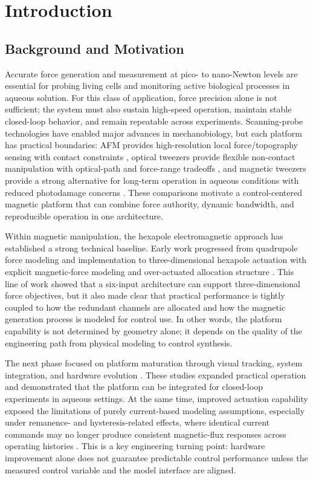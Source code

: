 \chapter{Introduction}

\section{Background and Motivation}

Accurate force generation and measurement at pico- to nano-Newton levels are essential for probing living cells and monitoring active biological processes in aqueous solution. For this class of application, force precision alone is not sufficient; the system must also sustain high-speed operation, maintain stable closed-loop behavior, and remain repeatable across experiments. Scanning-probe technologies have enabled major advances in mechanobiology, but each platform has practical boundaries: AFM provides high-resolution local force/topography sensing with contact constraints \cite{binnig1986afm,neuman2008singlemolecule}, optical tweezers provide flexible non-contact manipulation with optical-path and force-range tradeoffs \cite{ashkin1986observation,neuman2008singlemolecule}, and magnetic tweezers provide a strong alternative for long-term operation in aqueous conditions with reduced photodamage concerns \cite{gosse2002magnetic,devlaminck2012magnetic}. These comparisons motivate a control-centered magnetic platform that can combine force authority, dynamic bandwidth, and reproducible operation in one architecture.

Within magnetic manipulation, the hexapole electromagnetic approach has established a strong technical baseline. Early work progressed from quadrupole force modeling and implementation \cite{zhang2010quadrupole} to three-dimensional hexapole actuation with explicit magnetic-force modeling and over-actuated allocation structure \cite{zhang2011design}. This line of work showed that a six-input architecture can support three-dimensional force objectives, but it also made clear that practical performance is tightly coupled to how the redundant channels are allocated and how the magnetic generation process is modeled for control use. In other words, the platform capability is not determined by geometry alone; it depends on the quality of the engineering path from physical modeling to control synthesis.

The next phase focused on platform maturation through visual tracking, system integration, and hardware evolution \cite{zhang2013visual,long2016actively,long2016dissertation}. These studies expanded practical operation and demonstrated that the platform can be integrated for closed-loop experiments in aqueous settings. At the same time, improved actuation capability exposed the limitations of purely current-based modeling assumptions, especially under remanence- and hysteresis-related effects, where identical current commands may no longer produce consistent magnetic-flux responses across operating histories \cite{long2022hallsensor}. This is a key engineering turning point: hardware improvement alone does not guarantee predictable control performance unless the measured control variable and the model interface are aligned.

